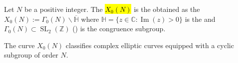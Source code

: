 \begin{definition} \label{definition:modular_curves_X0}
Let $N$ be a positive integer. The  \hl{$X_0(N)$} is the   obtained as the 
$X_0(N) := \Gamma_0(N)\backslash\overline{\mathbb{H}}$
where $\mathbb{H} = \{z \in \mathbb{C} : \operatorname{Im}(z) > 0\}$ is the  and $\Gamma_0(N) \subset \operatorname{SL}_2(\mathbb{Z})$ () is the congruence subgroup.

The curve $X_0(N)$ classifies complex elliptic curves equipped with a cyclic subgroup of order $N$.
\end{definition}
